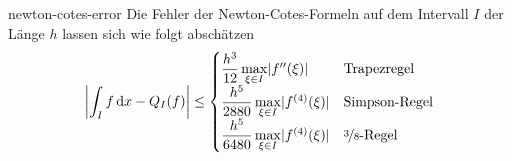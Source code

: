 \begin{Satz}{newton-cotes-error}
  Die Fehler der Newton-Cotes-Formeln auf dem Intervall $I$ der Länge
  $h$ lassen sich wie folgt abschätzen
  \begin{gather}
    \left|\int_I f\,\mathrm{d} x - Q_I(f)\right| \le
    \begin{cases}
      \dfrac{h^3}{12}\max\limits_{\xi\in I}\lvert f''(\xi)\rvert
      &\text{Trapezregel}\\
      \dfrac{h^5}{2880}\max\limits_{\xi\in I}\lvert f^{(4)}(\xi)\rvert
      &\text{Simpson-Regel}\\
      \dfrac{h^5}{6480}\max\limits_{\xi\in I}\lvert f^{(4)}(\xi)\rvert
      &\text{\nicefrac38-Regel}
    \end{cases}
  \end{gather}
\end{Satz}

